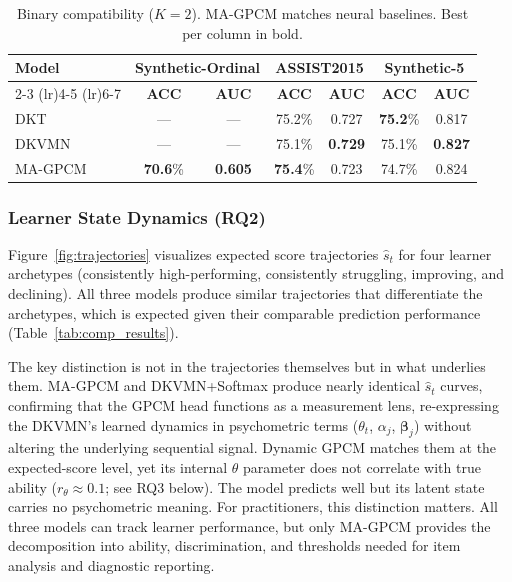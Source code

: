 \documentclass[pdflatex,sn-apa]{sn-jnl}
\begin{document}
\begin{table}[htb!]
\centering
\caption{Binary compatibility ($K=2$). MA-GPCM matches neural baselines. Best per column in bold.}
\label{tab:combined_perf}
\small
\setlength{\tabcolsep}{3pt}
\begin{tabular}{lcccccc}
\toprule
\textbf{Model} & \multicolumn{2}{c}{\textbf{Synthetic-Ordinal}} & \multicolumn{2}{c}{\textbf{ASSIST2015}} & \multicolumn{2}{c}{\textbf{Synthetic-5}} \\
\cmidrule(lr){2-3} \cmidrule(lr){4-5} \cmidrule(lr){6-7}
& \textbf{ACC} & \textbf{AUC} & \textbf{ACC} & \textbf{AUC} & \textbf{ACC} & \textbf{AUC} \\
\midrule
DKT & --- & --- & 75.2\% & 0.727 & \textbf{75.2}\% & 0.817 \\
DKVMN & --- & --- & 75.1\% & \textbf{0.729} & 75.1\% & \textbf{0.827} \\
MA-GPCM & \textbf{70.6}\% & \textbf{0.605} & \textbf{75.4}\% & 0.723 & 74.7\% & 0.824 \\
\bottomrule
\end{tabular}
\end{table}

\subsubsection{Learner State Dynamics (RQ2)}
\label{sec:trajectories}
Figure~\ref{fig:trajectories} visualizes expected score trajectories $\hat{s}_t$ for four learner archetypes (consistently high-performing, consistently struggling, improving, and declining). All three models produce similar trajectories that differentiate the archetypes, which is expected given their comparable prediction performance (Table~\ref{tab:comp_results}).

The key distinction is not in the trajectories themselves but in what underlies them. MA-GPCM and DKVMN+Softmax produce nearly identical $\hat{s}_t$ curves, confirming that the GPCM head functions as a measurement lens, re-expressing the DKVMN's learned dynamics in psychometric terms ($\theta_t$, $\alpha_j$, $\boldsymbol{\beta}_j$) without altering the underlying sequential signal. Dynamic GPCM matches them at the expected-score level, yet its internal $\theta$ parameter does not correlate with true ability ($r_\theta \approx 0.1$; see RQ3 below). The model predicts well but its latent state carries no psychometric meaning. For practitioners, this distinction matters. All three models can track learner performance, but only MA-GPCM provides the decomposition into ability, discrimination, and thresholds needed for item analysis and diagnostic reporting.
\end{document}
